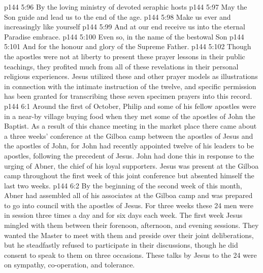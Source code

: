 \vs p144 5:96 By the loving ministry of devoted seraphic hosts
\vs p144 5:97 \hsetoff May the Son guide and lead us to the end of the age.
\vs p144 5:98 Make us ever and increasingly like yourself
\vs p144 5:99 \hsetoff And at our end receive us into the eternal Paradise embrace.
\vs p144 5:100 Even so, in the name of the bestowal Son
\vs p144 5:101 \hsetoff And for the honour and glory of the Supreme Father.
\vspace*{1ex}
\vs p144 5:102 Though the apostles were not at liberty to present these prayer lessons in their public teachings, they profited much from all of these revelations in their personal religious experiences. Jesus utilized these and other prayer models as illustrations in connection with the intimate instruction of the twelve, and specific permission has been granted for transcribing these seven specimen prayers into this record.
\vs p144 6:1 Around the first of October, Philip and some of his fellow apostles were in a near-by village buying food when they met some of the apostles of John the Baptist. As a result of this chance meeting in the market place there came about a three weeks’ conference at the Gilboa camp between the apostles of Jesus and the apostles of John, for John had recently appointed twelve of his leaders to be apostles, following the precedent of Jesus. John had done this in response to the urging of Abner, the chief of his loyal supporters. Jesus was present at the Gilboa camp throughout the first week of this joint conference but absented himself the last two weeks.
\vs p144 6:2 By the beginning of the second week of this month, Abner had assembled all of his associates at the Gilboa camp and was prepared to go into council with the apostles of Jesus. For three weeks these 24 men were in session three times a day and for six days each week. The first week Jesus mingled with them between their forenoon, afternoon, and evening sessions. They wanted the Master to meet with them and preside over their joint deliberations, but he steadfastly refused to participate in their discussions, though he did consent to speak to them on three occasions. These talks by Jesus to the 24 were on sympathy, co\hyp{}operation, and tolerance.
